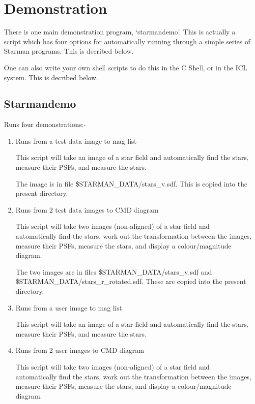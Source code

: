  
\newpage
 
 
\section{Demonstration}
\label{se:demo}


  There is one main demonstration program, `starmandemo'. This
  is actually a script which has four options for automatically
  running through a simple series of Starman programs. This is
  decribed below.

  One can also write your own shell scripts to do this in the
  C Shell, or in the ICL system. This is decribed below.
   
\subsection{Starmandemo}


  Runs four demonstrations:-

 \begin{enumerate}
 \item Runs from a test data image to mag list

  This script will take an image of a star field
  and automatically find the stars, measure their PSFs, and measure
  the stars.
  
 The image is in file \$STARMAN\_DATA/stars\_v.sdf. This is copied
  into the present directory.

  
 \item Runs from 2 test data images to CMD diagram

  This script will take two images (non-aligned) of a star field
  and automatically find the stars, work out the transformation
  between the images, measure their PSFs, measure the stars, and
  display a colour/magnitude diagram.

  The two images are in files \$STARMAN\_DATA/stars\_v.sdf  and
  \newline
   \$STARMAN\_DATA/stars\_r\_rotated.sdf. These are copied into
  the present directory.
   
 \item Runs from a user image to mag list

  This script will take an image of a star field
  and automatically find the stars, measure their PSFs, and measure
  the stars.
  
 \item Runs from 2 user images to CMD diagram

  This script will take two images (non-aligned) of a star field
  and automatically find the stars, work out the transformation
  between the images, measure their PSFs, measure the stars, and
  display a colour/magnitude diagram.
  

 \end{enumerate}

